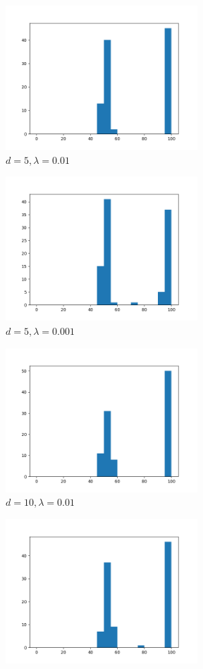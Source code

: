 \documentclass[titlepage]{report}
\begin{document}
\begin{figure}[H]
\centering
\begin{subfigure}{7cm}
\centering\includegraphics[width = 72mm]{figures/histograms/factor1/manual/5-01}
\caption{$d = 5, \lambda = 0.01$}
\end{subfigure}
\begin{subfigure}{7cm}
\centering\includegraphics[width = 72mm]{figures/histograms/factor1/manual/5-001}
\caption{$d = 5, \lambda = 0.001$}
\end{subfigure}
\begin{subfigure}{7cm}
\centering\includegraphics[width = 72mm]{figures/histograms/factor1/manual/10-01}
\caption{$d = 10, \lambda = 0.01$}
\end{subfigure}
\begin{subfigure}{7cm}
\centering\includegraphics[width = 72mm]{figures/histograms/factor1/manual/10-001}

\end{subfigure}
\end{figure}
\end{document}
